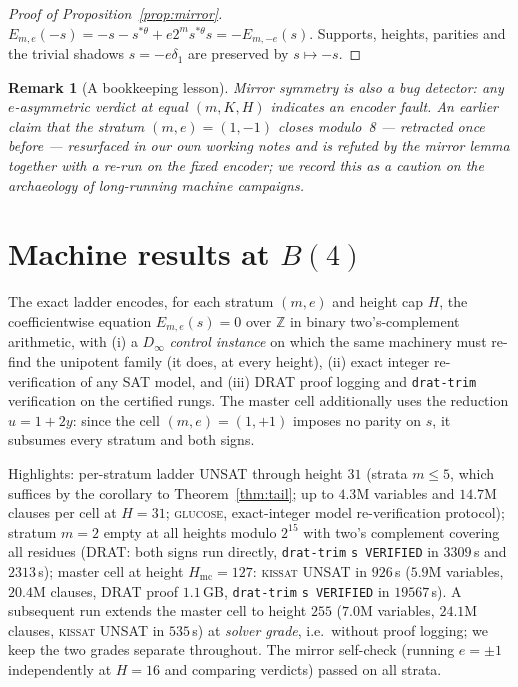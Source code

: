 \documentclass[11pt]{article}
\newtheorem{remark}[theorem]{Remark}
\newcommand{\ZZ}{\mathbb{Z}}
\newcommand{\thst}{{*\theta}}
\begin{document}
\begin{proof}[Proof of Proposition~\ref{prop:mirror}]
$E_{m,e}(-s)=-s-s^{\thst}+e2^m s^{\thst}s=-E_{m,-e}(s)$.  Supports,
heights, parities and the trivial shadows $s=-e\delta_1$ are
preserved by $s\mapsto-s$.
\end{proof}

\begin{remark}[A bookkeeping lesson]
Mirror symmetry is also a bug detector: any $e$-asymmetric verdict at
equal $(m,K,H)$ indicates an encoder fault.  An earlier claim that the
stratum $(m,e)=(1,-1)$ closes modulo~8 --- retracted once before ---
resurfaced in our own working notes and is refuted by the mirror
lemma together with a re-run on the fixed encoder; we record this as
a caution on the archaeology of long-running machine campaigns.
\end{remark}

\section{Machine results at $B(4)$}\label{sec:machine}

The exact ladder encodes, for each stratum $(m,e)$ and height cap
$H$, the coefficientwise equation $E_{m,e}(s)=0$ over $\ZZ$ in binary
two's-complement arithmetic, with (i) a $D_\infty$ \emph{control
instance} on which the same machinery must re-find the unipotent
family (it does, at every height), (ii) exact integer re-verification
of any SAT model, and (iii) DRAT proof logging and \texttt{drat-trim}
verification on the certified rungs.  The master cell additionally
uses the reduction $u=1+2y$: since the cell $(m,e)=(1,+1)$ imposes no
parity on $s$, it subsumes every stratum and both signs.

Highlights: per-stratum ladder UNSAT through height $31$ (strata
$m\le 5$, which suffices by the corollary to Theorem~\ref{thm:tail};
up to $4.3$M variables and $14.7$M clauses per cell at $H=31$;
\textsc{glucose}, exact-integer model re-verification protocol);
stratum $m=2$ empty at all heights modulo $2^{15}$ with two's
complement covering all residues (DRAT: both signs run directly,
\texttt{drat-trim} \texttt{s VERIFIED} in $3309$\,s and $2313$\,s);
master cell at height $H_{\mathrm{mc}}=127$: \textsc{kissat} UNSAT in
$926$\,s ($5.9$M variables, $20.4$M clauses, DRAT proof $1.1$\,GB,
\texttt{drat-trim} \texttt{s VERIFIED} in $19567$\,s).  A subsequent
run extends the master cell to height $255$ ($7.0$M variables,
$24.1$M clauses, \textsc{kissat} UNSAT in $535$\,s) at \emph{solver
grade}, i.e.\ without proof logging; we keep the two grades separate
throughout.  The mirror self-check (running $e=\pm1$ independently at
$H=16$ and comparing verdicts) passed on all strata.
\end{document}
